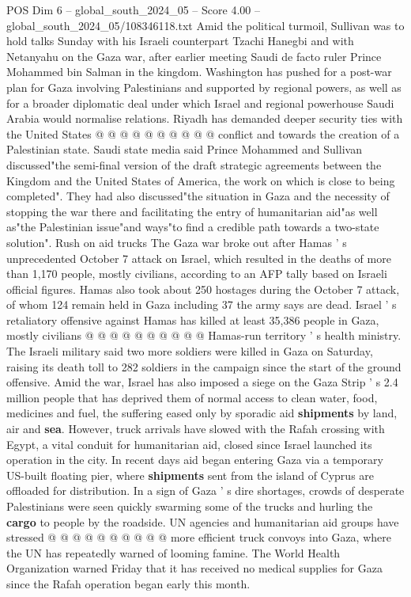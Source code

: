 \begin{textsample}{POS Dim 6 – global\_south\_2024\_05 – Score 4.00 – global\_south\_2024\_05/108346118.txt}
Amid the political turmoil, Sullivan was to hold talks Sunday with his Israeli counterpart Tzachi Hanegbi and with Netanyahu on the Gaza war, after earlier meeting Saudi de facto ruler Prince Mohammed bin Salman in the kingdom.
Washington has pushed for a post-war plan for Gaza involving Palestinians and supported by regional powers, as well as for a broader diplomatic deal under which Israel and regional powerhouse Saudi Arabia would normalise relations.
Riyadh has demanded deeper security ties with the United States @ @ @ @ @ @ @ @ @ @ conflict and towards the creation of a Palestinian state.
Saudi state media said Prince Mohammed and Sullivan discussed"the semi-final version of the draft strategic agreements between the Kingdom and the United States of America, the work on which is close to being completed".
They had also discussed"the situation in Gaza and the necessity of stopping the war there and facilitating the entry of humanitarian aid"as well as"the Palestinian issue"and ways"to find a credible path towards a two-state solution".
Rush on aid trucks The Gaza war broke out after Hamas ' s unprecedented October 7 attack on Israel, which resulted in the deaths of more than 1,170 people, mostly civilians, according to an AFP tally based on Israeli official figures.
Hamas also took about 250 hostages during the October 7 attack, of whom 124 remain held in Gaza including 37 the army says are dead.
Israel ' s retaliatory offensive against Hamas has killed at least 35,386 people in Gaza, mostly civilians @ @ @ @ @ @ @ @ @ @ Hamas-run territory ' s health ministry.
The Israeli military said two more soldiers were killed in Gaza on Saturday, raising its death toll to 282 soldiers in the campaign since the start of the ground offensive.
Amid the war, Israel has also imposed a siege on the Gaza Strip ' s 2.4 million people that has deprived them of normal access to clean water, food, medicines and fuel, the suffering eased only by sporadic aid \textbf{shipments} by land, air and \textbf{sea}.
However, truck arrivals have slowed with the Rafah crossing with Egypt, a vital conduit for humanitarian aid, closed since Israel launched its operation in the city.
In recent days aid began entering Gaza via a temporary US-built floating pier, where \textbf{shipments} sent from the island of Cyprus are offloaded for distribution.
In a sign of Gaza ' s dire shortages, crowds of desperate Palestinians were seen quickly swarming some of the trucks and hurling the \textbf{cargo} to people by the roadside.
UN agencies and humanitarian aid groups have stressed @ @ @ @ @ @ @ @ @ @ more efficient truck convoys into Gaza, where the UN has repeatedly warned of looming famine.
The World Health Organization warned Friday that it has received no medical supplies for Gaza since the Rafah operation began early this month.

\end{textsample}

